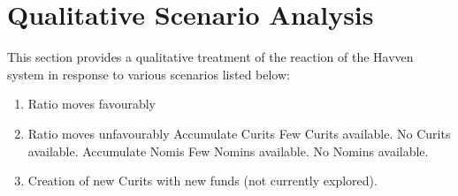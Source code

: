 
\section{Qualitative Scenario Analysis}

This section provides a qualitative treatment of the reaction of the Havven system in response to various scenarios listed below:


\begin{enumerate}
	\item Ratio moves favourably
	\item Ratio moves unfavourably
		\subitem Accumulate Curits
			\subsubitem Few Curits available.
			\subsubitem No Curits available.
		\subitem Accumulate Nomis
			\subsubitem Few Nomins available.
			\subsubitem No Nomins available.
	\item Creation of new Curits with new funds (not currently explored).
\end{enumerate}


\pagebreak